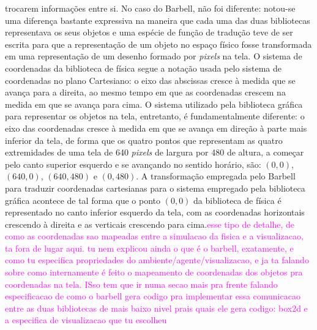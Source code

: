 \documentclass[cic,tc]{iiufrgs}
\newcommand\bruno[1]{\textcolor{magenta}{#1}}
\begin{document}
trocarem informações entre si. No caso do Barbell, não foi diferente: notou-se uma diferença bastante expressiva na maneira que cada uma das duas bibliotecas
representava os seus objetos e uma espécie de função de tradução teve de ser escrita para que a representação de um objeto no espaço físico fosse transformada
em uma representação de um desenho formado por \textit{pixels} na tela. O sistema de coordenadas da biblioteca de física segue a notação usada pelo sistema
de coordenadas no plano Cartesiano: o eixo das abscissas cresce à medida que se avança para a direita, ao mesmo tempo em que as coordenadas crescem na medida
 em que se avança para cima. O sistema utilizado pela biblioteca gráfica para representar os objetos na tela, entretanto, é fundamentalmente diferente: o eixo
 das coordenadas cresce à medida em que se avança em direção à parte mais inferior da tela, de forma que os quatro pontos que representam as quatro extremidades
 de uma tela de 640 \textit{pixels} de largura por 480 de altura, a começar pelo canto superior esquerdo e se avançando no sentido horário, são: $(0,0)$, $(640,0)$,
 $(640,480)$ e $(0,480)$. A transformação empregada pelo Barbell para traduzir coordenadas cartesianas para o sistema empregado pela biblioteca gráfica acontece
 de tal forma que o ponto $(0,0)$ da biblioteca de física é representado no canto inferior esquerdo da tela, com as coordenadas horizontais crescendo à direita
 e as verticais crescendo para cima.\bruno{esse tipo de detalhe, de como as coordenadas sao mapeadas entre a simulacao da fisica e a visualizacao, ta fora de lugar aqui. tu nem explicou ainda o que é o barbell, exatamente, e como tu especifica propriedades do ambiente/agente/visualizacao, e ja ta falando sobre como internamente é feito o mapeamento de coordenadas dos objetos pra coordenadas na tela. ISso tem que ir numa secao mais pra frente falando especificacao de como o barbell gera codigo pra implementar essa comunicacao entre as duas bibliotecas de mais baixo nivel prais quais ele gera codigo: box2d e a especifica de visualizacao que tu escolheu}
\end{document}
